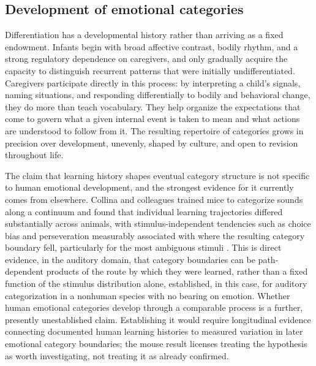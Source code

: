 \documentclass[11pt]{article}
\begin{document}
\subsection{Development of emotional categories}

Differentiation has a developmental history rather than arriving as a fixed endowment. Infants begin with broad affective contrast, bodily rhythm, and a strong regulatory dependence on caregivers, and only gradually acquire the capacity to distinguish recurrent patterns that were initially undifferentiated. Caregivers participate directly in this process: by interpreting a child's signals, naming situations, and responding differentially to bodily and behavioral change, they do more than teach vocabulary. They help organize the expectations that come to govern what a given internal event is taken to mean and what actions are understood to follow from it. The resulting repertoire of categories grows in precision over development, unevenly, shaped by culture, and open to revision throughout life.

The claim that learning history shapes eventual category structure is not specific to human emotional development, and the strongest evidence for it currently comes from elsewhere. Collina and colleagues trained mice to categorize sounds along a continuum and found that individual learning trajectories differed substantially across animals, with stimulus-independent tendencies such as choice bias and perseveration measurably associated with where the resulting category boundary fell, particularly for the most ambiguous stimuli \citep{Collina2025}. This is direct evidence, in the auditory domain, that category boundaries can be path-dependent products of the route by which they were learned, rather than a fixed function of the stimulus distribution alone, established, in this case, for auditory categorization in a nonhuman species with no bearing on emotion. Whether human emotional categories develop through a comparable process is a further, presently unestablished claim. Establishing it would require longitudinal evidence connecting documented human learning histories to measured variation in later emotional category boundaries; the mouse result licenses treating the hypothesis as worth investigating, not treating it as already confirmed.
\end{document}

